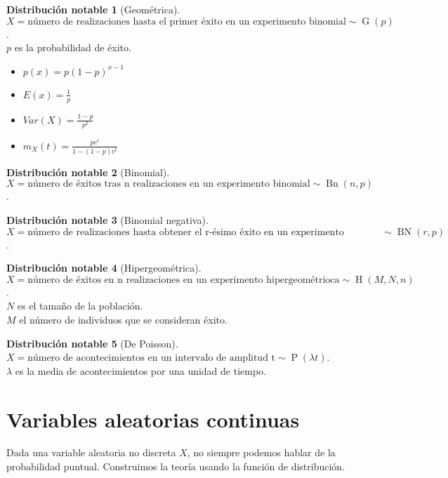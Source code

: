 \documentclass{article}
\theoremstyle{definition}
\newtheorem{distr}{Distribución notable}
\theoremstyle{remark}
\DeclareMathOperator{\binomial}{Bn}
\DeclareMathOperator{\binomialneg}{BN}
\DeclareMathOperator{\geometrica}{G}
\DeclareMathOperator{\hipergeom}{H}
\DeclareMathOperator{\poisson}{P}
\begin{document}
\begin{distr}[Geométrica]
	$X = \text{número de realizaciones hasta el primer éxito en un experimento binomial} \sim \geometrica(p)$.\\
	$p$ es la probabilidad de éxito.
	\begin{itemize}
		\item
		$p(x) = p(1-p)^{x-1}$
		\item
		$E(x) = \frac{1}{p}$
		\item
		$Var(X) = \frac{1-p}{p^2}$
		\item
		$m_X(t) = \frac{pe^t}{1 - (1 - p)e^t}$
	\end{itemize}
\end{distr}

\begin{distr}[Binomial]
	$X = \text{número de éxitos tras n realizaciones en un experimento binomial} \sim \binomial(n, p)$.
\end{distr}

\begin{distr}[Binomial negativa]
	$X = \text{número de realizaciones hasta obtener el r-ésimo éxito en un experimento binomial} \sim \binomialneg(r, p)$.
\end{distr}

\begin{distr}[Hipergeométrica]
	$X = \text{número de éxitos en n realizaciones en un experimento hipergeométrioca} \sim \hipergeom(M,N,n)$.\\
	$N$ es el tamaño de la población.\\
	$M$ el número de individuos que se consideran éxito.
\end{distr}

\begin{distr}[De Poisson]
	$X = \text{número de acontecimientos en un intervalo de amplitud t} \sim \poisson(\lambda t)$.\\
	$\lambda$ es la media de acontecimientos por una unidad de tiempo.
\end{distr}





\section{Variables aleatorias continuas}
Dada una variable aleatoria no discreta $X$, no siempre podemos hablar de la probabilidad puntual. Construimos la teoría usando la función de distribución.
\end{document}
